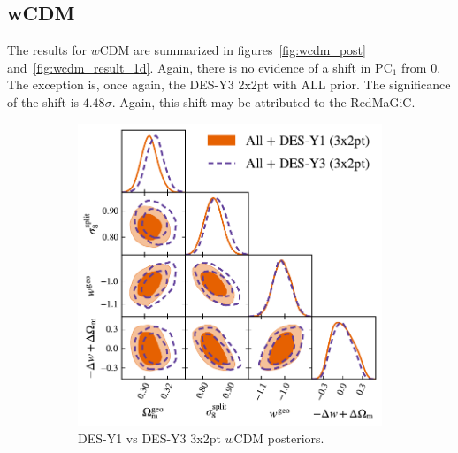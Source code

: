 \subsection{wCDM}
The results for $w$CDM are summarized in figures~\ref{fig:wcdm_post} and~\ref{fig:wcdm_result_1d}. Again, there is no evidence of a shift in $\mathrm{PC}_1$ from 0. The exception is, once again, the DES-Y3 2x2pt with ALL prior. The significance of the shift is $4.48\sigma$. Again, this shift may be attributed to the RedMaGiC. 
\begin{figure}[ht]
	\centering
	\begin{subfigure}[b]{0.45\textwidth}
		\includegraphics[width=\textwidth]{plots/plot205v2.pdf}
		\caption{DES-Y1 vs DES-Y3 3x2pt $w$CDM posteriors.}
		\label{fig:y3_y1_wcdm}
	\end{subfigure}
	\begin{subfigure}[b]{0.45\textwidth}

\end{subfigure}
\end{figure}
